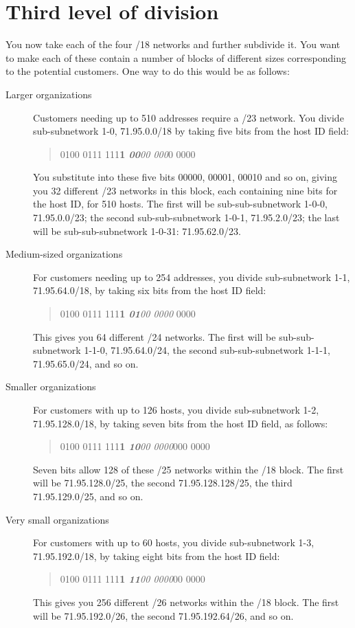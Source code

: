 \section{Third level of division}

You now take each of the four /18 networks and further subdivide it. You
want to make each of these contain a number of blocks of different sizes
corresponding to the potential customers. One way to do this would be as
follows:
\begin{description}
   \item[Larger organizations]
      Customers needing up to 510 addresses require a /23 network.
      You divide sub-subnetwork 1-0, 71.95.0.0/18 by taking five bits from the host ID field:
      \begin{quote}
      0100 0111 111\textbf{1 \textit{00}}\emph{00 000}0 0000
      \end{quote}
      You substitute into these five bits 00000, 00001, 00010 and so on, giving you 32 different /23 networks in this block,
      each containing nine bits for the host ID, for 510 hosts.
      The first will be sub-sub-subnetwork 1-0-0, 71.95.0.0/23; the second sub-sub-subnetwork 1-0-1, 71.95.2.0/23;
      the last will be sub-sub-subnetwork 1-0-31: 71.95.62.0/23.

   \item[Medium-sized organizations]
      For customers needing up to 254 addresses, you divide sub-subnetwork 1-1, 71.95.64.0/18, by taking six bits from the host ID field:
      \begin{quote}
      0100 0111 111\textbf{1 \textit{01}}\emph{00 0000} 0000
      \end{quote}
      This gives you 64 different /24 networks.
      The first will be sub-sub-subnetwork 1-1-0, 71.95.64.0/24, the second sub-sub-subnetwork 1-1-1, 71.95.65.0/24, and so on.

   \item[Smaller organizations]
      For customers with up to 126 hosts, you divide sub-subnetwork 1-2, 71.95.128.0/18, by taking seven bits from the host ID field, as follows:
      \begin{quote}
      0100 0111 111\textbf{1 \textit{10}}\emph{00 0000}000 0000
      \end{quote}

      Seven bits allow 128 of these /25 networks within the /18 block.
      The first will be 71.95.128.0/25, the second 71.95.128.128/25, the third 71.95.129.0/25, and so on.

   \item[Very small organizations]
      For customers with up to 60 hosts, you divide sub-subnetwork 1-3, 71.95.192.0/18, by taking eight bits from the host ID field:
      \begin{quote}
      0100 0111 111\textbf{1 \textit{11}}\emph{00 0000}00 0000
      \end{quote}
      
      This gives you 256 different /26 networks within the /18 block.
      The first will be 71.95.192.0/26, the second 71.95.192.64/26, and so on.
\end{description}

